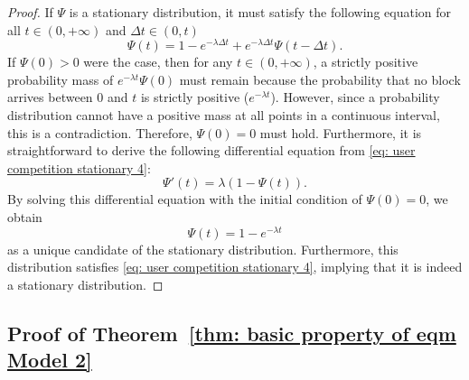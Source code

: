 \documentclass[12pt, letterpaper]{article}
\begin{document}
\begin{proof}
    If $\Psi$ is a stationary distribution, it must satisfy the following equation for all $t \in (0, + \infty)$ and $\Delta t \in (0, t)$
    \begin{equation}\label{eq: user competition stationary 4}
        \Psi(t) = 1 - e^{- \lambda \Delta t} + e^{- \lambda \Delta t} \Psi(t - \Delta t).
    \end{equation}
    If $\Psi(0) > 0$ were the case, then for any $t \in (0, + \infty)$,   a strictly positive probability mass of $e^{- \lambda t} \Psi(0)$ must remain because the probability that no block arrives between $0$ and $t$ is strictly positive ($e^{- \lambda t}$). However, since a probability distribution cannot have a positive mass at all points in a continuous interval, this is a contradiction. Therefore, $\Psi(0) = 0$ must hold. Furthermore, it is straightforward to derive the following differential equation from \eqref{eq: user competition stationary 4}:
    \begin{equation}
        \Psi'(t) = \lambda (1 - \Psi(t)).
    \end{equation}
    By solving this differential equation with the initial condition of $\Psi(0) = 0$, we obtain
    \begin{equation}
        \Psi(t) = 1 - e^{- \lambda t}
    \end{equation}
    as a unique candidate of the stationary distribution. Furthermore, this distribution satisfies \eqref{eq: user competition stationary 4}, implying that it is indeed a stationary distribution.
\end{proof}





\subsection{Proof of Theorem~\ref{thm: basic property of eqm Model 2}}\label{subsec: basic property of eqm Model 2}
\end{document}

